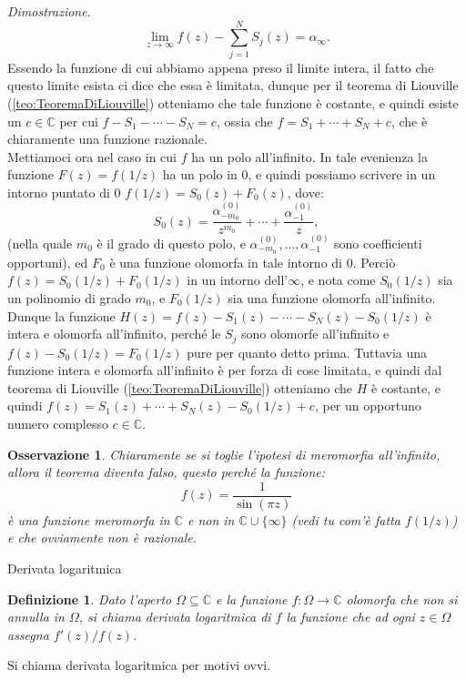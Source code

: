 \documentclass[11pt]{book}
\makeatletter
\theoremstyle{Definizione}
\newtheorem*{mydef}{Definizione}
\theoremstyle{TeoremaProposizioneLemmaCorollarioCongettura}
\theoremstyle{OsservazioneNotaEsempio}
\newtheorem{myobs}{Osservazione}[section]
\renewenvironment{proof}[1][\proofname]{\par
  \normalfont \topsep6\p@\@plus6\p@\relax
  \trivlist
  \item[\hskip\labelsep
        \itshape
    #1\@addpunct{.}]\ignorespaces
}{%
  \endtrivlist\@endpefalse
}
\renewenvironment{proof}{\textsl{Dimostrazione}.}{}
\newcommand{\C}{\mathbb{C}}
\makeatother
\begin{document}
\begin{boxteo}{}
\begin{proof}
$$
\lim_{z \to \infty} f(z)- \sum_{j = 1}^N S_j(z) = \alpha_\infty.
$$
Essendo la funzione di cui abbiamo appena preso il limite intera, il fatto che questo limite esista ci dice che essa è limitata, dunque per il teorema di Liouville (\ref{teo:TeoremaDiLiouville}) otteniamo che tale funzione è costante, e quindi esiste un $c\in \C$ per cui $f-S_1-\cdots-S_N = c$, ossia che $f = S_1+\cdots+S_N + c$, che è chiaramente una funzione razionale.\\
Mettiamoci ora nel caso in cui $f$ ha un polo all'infinito. In tale evenienza la funzione $F(z) = f(1/z)$ ha un polo in $0$, e quindi possiamo scrivere in un intorno puntato di $0$ $f(1/z) = S_0(z)+F_0(z)$, dove:
$$
S_0(z) = \frac{\alpha_{-m_0}^{(0)}}{z^{m_0}}+\cdots+\frac{\alpha_{-1}^{(0)}}{z},
$$
(nella quale $m_0$ è il grado di questo polo, e $\alpha_{-m_0}^{(0)},\dots,\alpha_{-1}^{(0)}$ sono coefficienti opportuni), ed $F_0$ è una funzione olomorfa in tale intorno di $0$. Perciò $f(z) = S_0(1/z)+F_0(1/z)$ in un intorno dell'$\infty$, e nota come $S_0(1/z)$ sia un polinomio di grado $m_0$, e $F_0(1/z)$ sia una funzione olomorfa all'infinito. Dunque la funzione $H(z) = f(z)-S_1(z)-\cdots-S_N(z)-S_0(1/z)$ è intera e olomorfa all'infinito, perché le $S_j$ sono olomorfe all'infinito e $f(z)-S_0(1/z) = F_0(1/z)$ pure per quanto detto prima. Tuttavia una funzione intera e olomorfa all'infinito è per forza di cose limitata, e quindi dal teorema di Liouville (\ref{teo:TeoremaDiLiouville}) otteniamo che $H$ è costante, e quindi $f(z) = S_1(z)+\cdots+S_N(z)-S_0(1/z) +c$, per un opportuno numero complesso $c\in \C$.
\end{proof}
\end{boxteo}
\begin{myobs}
Chiaramente se si toglie l'ipotesi di meromorfia all'infinito, allora il teorema diventa falso, questo perché la funzione:
$$
f(z) = \frac{1}{\sin(\pi z)}
$$
è una funzione meromorfa in $\C$ e non in $\C \cup\{\infty\}$ (vedi tu com'è fatta $f(1/z)$) e che ovviamente non è razionale.
\end{myobs}
\begin{boxdef}{Derivata logaritmica}
\begin{mydef}
Dato l'aperto $\Omega\subseteq \C$ e la funzione $f:\Omega\longrightarrow \C$ olomorfa che non si annulla in $\Omega$, si chiama derivata logaritmica di $f$ la funzione che ad ogni $z\in \Omega$ assegna $f'(z)/f(z)$.
\end{mydef}
\end{boxdef}
\noindent
Si chiama derivata logaritmica per motivi ovvi.
\end{document}
